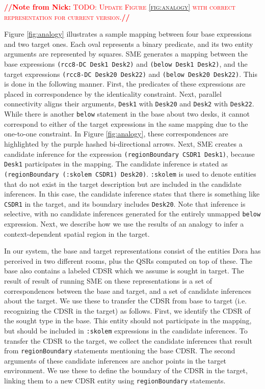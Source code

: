 \documentclass[letterpaper]{article}
\newcommand{\from}[2]{\textcolor{red}{\noindent\textbf{//}\textbf{Note
      from #1:}\textsc{ #2}\textbf{//}}}
\newcommand{\fw}[1]{\texttt{#1}}
\begin{document}
\from{Nick}{TODO: Update Figure \ref{fig:analogy} with correct representation for current version.}

Figure \ref{fig:analogy} illustrates a sample mapping between four base expressions and two target ones. Each oval represents a binary predicate, and its two entity arguments are represented by squares. SME generates a mapping between the base expressions \fw{(rcc8-DC Desk1 Desk2)} and \fw{(below Desk1 Desk2)}, and the  target expressions \fw{(rcc8-DC Desk20 Desk22)} and \fw{(below Desk20 Desk22)}. This is done in the following manner. First, the predicates of these expressions are placed in correspondence by the identicality constraint. Next, parallel connectivity aligns their arguments, \fw{Desk1} with \fw{Desk20} and \fw{Desk2} with \fw{Desk22}. While there is another \fw{below} statement in the base about two desks, it cannot correspond to either of the target expressions in the same mapping due to the one-to-one constraint. In Figure \ref{fig:analogy}, these correspondences are highlighted by the purple hashed bi-directional arrows. Next, SME creates a candidate inference for the expression \fw{(regionBoundary CSDR1 Desk1)}, because \fw{Desk1} participates in the mapping. The candidate inference is stated as \fw{(regionBoundary (:skolem CSDR1) Desk20)}. \fw{:skolem} is used to denote entities that do not exist in the target description but are included in the candidate inferences. In this case, the candidate inference states that there is something like \fw{CSDR1} in the target, and its boundary includes \fw{Desk20}. Note that inference is selective, with no candidate inferences generated for the entirely unmapped \fw{below} expression. Next, we describe how we use the results of an analogy to infer a context-dependent spatial region in the target.
 

In our system, the base and target representations consist of the entities Dora has perceived in two different rooms, plus the QSRs computed on top of these. The base also contains a labeled CDSR which we assume is sought in target. The result of result of running SME on these representations is a set of correspondences between the base and target, and a set of candidate inferences about the target. We use these to transfer the CDSR from base to target (i.e. recognizing the CDSR in the target) as follows. First, we identify the CDSR of the sought type in the base. This entity should not participate in the mapping, but should be included in \fw{:skolem} expressions in the candidate inferences. To transfer the CDSR to the target, we collect the candidate inferences that result from \fw{regionBoundary} statements mentioning the base CDSR. The second arguments of these candidate inferences are anchor points in the target environment. We use these to define the boundary of the CDSR in the target, linking them to a new CDSR entity using \fw{regionBoundary} statements. 
\end{document}
